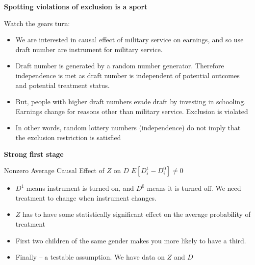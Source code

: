 \documentclass[notes=show]{beamer}
\begin{document}
\begin{frame}[plain]
\begin{center}
\textbf{Spotting violations of exclusion is a sport}
\end{center}

Watch the gears turn:
\begin{itemize}
\item We are interested in causal effect of military service on earnings, and so use draft number are instrument for military service. 
\item Draft number is generated by a random number generator. Therefore independence is met as draft number is independent of potential outcomes and potential treatment status. 
\item But, people with higher draft numbers evade draft by investing in schooling. Earnings change for reasons other than military service. Exclusion is violated
\item In other words, random lottery numbers (independence) do not imply that the exclusion restriction is satisfied
\end{itemize}

\end{frame}


\begin{frame}[plain]

	\begin{center}
	\textbf{Strong first stage}
	\end{center}
	
	\begin{block}{Nonzero Average Causal Effect of $Z$ on $D$}
	$E[D^1_{i} - D^0_{i}]\neq{0}$
	\end{block}
				
\begin{itemize}
\item $D^1$ means instrument is turned on, and $D^0$ means it is turned off. We need treatment to change when instrument changes.
\item $Z$ has to have some statistically significant effect on the average probability of treatment
\item First two children of the same gender makes you more likely to have a third.
\item Finally -- a testable assumption. We have data on $Z$ and $D$
\end{itemize}

\end{frame}			
\end{document}
